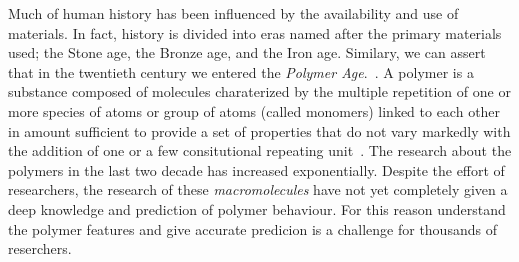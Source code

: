 %
%
%
%
%

Much of human history has been influenced by the availability and use of materials. In fact, history is divided into eras named after the primary materials used; the Stone age, the Bronze age, and the Iron age. Similary, we can assert that in the twentieth century we entered the \textit{Polymer Age}.~\cite{pp}. 
A polymer is a substance composed of molecules charaterized by the multiple repetition of one or more species of atoms or group of atoms (called monomers) linked to each other in amount sufficient to 
provide a set of properties that do not vary markedly with the addition of one
or a few consitutional repeating unit~\cite{bower}.
The research about the polymers in the last two decade has increased exponentially.
Despite the effort of researchers, the research of these \textit{macromolecules} have not yet completely given a deep knowledge and prediction of polymer behaviour.
For this reason understand the polymer features and give accurate predicion is a challenge for thousands of reserchers.

